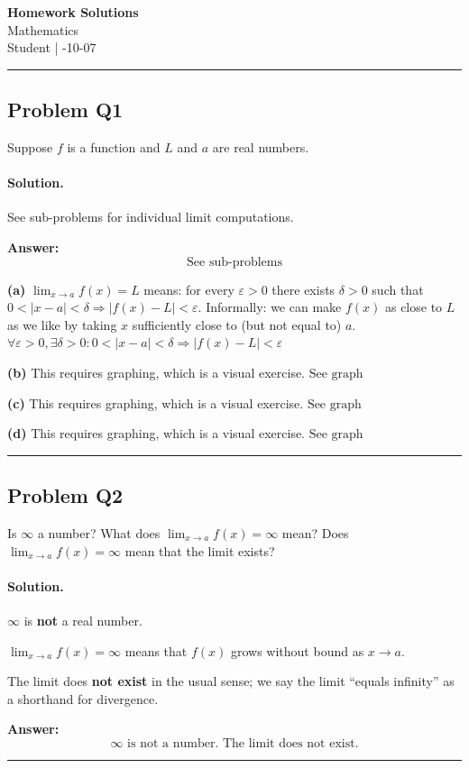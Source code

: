 \documentclass[12pt, a4paper]{article}
\newcommand{\problem}[1]{\subsection*{Problem #1}}
\newcommand{\solution}{\paragraph{Solution.}}
\begin{document}
\begin{center}
    {\LARGE\bfseries Homework Solutions} \\[0.5em]
    {\large Mathematics} \\[0.3em]
    Student \quad | -10-07
\end{center}

\hrule
\vspace{1em}
\problem{Q1}

Suppose $f$ is a function and $L$ and $a$ are real numbers.

\solution

See sub-problems for individual limit computations.

\textbf{Answer:}
\[\boxed{\text{See sub-problems}}\]

\textbf{(a)}
$\lim_{x \to a} f(x) = L$ means: for every $\varepsilon > 0$ there exists $\delta > 0$ such that
$0 < |x - a| < \delta \Rightarrow |f(x) - L| < \varepsilon$.
Informally: we can make $f(x)$ as close to $L$ as we like by taking $x$ sufficiently close to (but not equal to) $a$.
$\boxed{\forall \varepsilon > 0, \exists \delta > 0: 0 < |x-a| < \delta \Rightarrow |f(x)-L| < \varepsilon}$

\textbf{(b)}
This requires graphing, which is a visual exercise.
$\boxed{\text{See graph}}$

\textbf{(c)}
This requires graphing, which is a visual exercise.
$\boxed{\text{See graph}}$

\textbf{(d)}
This requires graphing, which is a visual exercise.
$\boxed{\text{See graph}}$

\vspace{1em}
\hrule
\vspace{1em}

\problem{Q2}

Is $\infty$ a number? What does $\lim_{x \to a} f(x) = \infty$ mean? Does $\lim_{x \to a} f(x) = \infty$ mean that the limit exists?

\solution

$\infty$ is \textbf{not} a real number.

$\lim_{x \to a} f(x) = \infty$ means that $f(x)$ grows without bound as $x \to a$.

The limit does \textbf{not exist} in the usual sense; we say the limit ``equals infinity'' as a shorthand for divergence.

\textbf{Answer:}
\[\boxed{\infty \text{ is not a number. The limit does not exist.}}\]

\vspace{1em}
\hrule
\vspace{1em}
\end{document}
